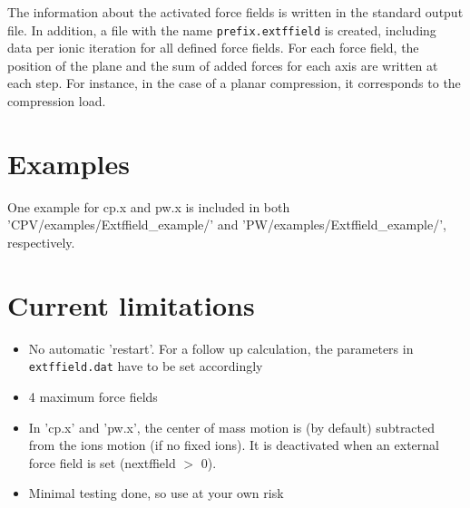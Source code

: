 \documentclass[a4paper,12pt,notitlepage]{article}
\begin{document}
The information about the activated force fields is written in the standard output file. In addition, a file with the name \texttt{prefix.extffield} is created, including data per ionic iteration for all defined force fields. For each force field, the position of the plane and the sum of added forces for each axis are written at each step. For instance, in the case of a planar compression, it corresponds to the compression load. 

\section{Examples}

One example for cp.x and pw.x is included in both 'CPV/examples/Extffield\_example/' and 'PW/examples/Extffield\_example/', respectively. 

\section{Current limitations}

\begin{itemize}
\item No automatic 'restart'. For a follow up calculation, the parameters in \texttt{extffield.dat} have to be set accordingly
\item 4 maximum force fields
\item In 'cp.x' and 'pw.x', the center of mass motion is (by default) subtracted from the ions motion (if no fixed ions). It is deactivated when an external force field is set (nextffield $>$ 0).
\item Minimal testing done, so use at your own risk
\end{itemize}
\end{document}
